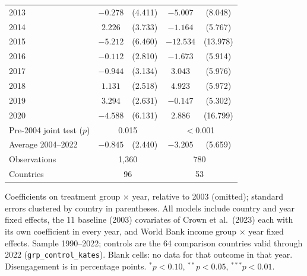 \begin{table}[htbp]
\begin{tabular}{lcccc}
2013 & $-0.278$ & (4.411) & $-5.007$ & (8.048) \\
2014 & $2.226$ & (3.733) & $-1.164$ & (5.767) \\
2015 & $-5.212$ & (6.460) & $-12.534$ & (13.978) \\
2016 & $-0.112$ & (2.810) & $-1.673$ & (5.914) \\
2017 & $-0.944$ & (3.134) & $3.043$ & (5.976) \\
2018 & $1.131$ & (2.518) & $4.923$ & (5.972) \\
2019 & $3.294$ & (2.631) & $-0.147$ & (5.302) \\
2020 & $-4.588$ & (6.131) & $2.886$ & (16.799) \\
\midrule
Pre-2004 joint test ($p$) & \multicolumn{2}{c}{0.015} & \multicolumn{2}{c}{$<$0.001} \\
Average 2004--2022 & $-0.845$ & (2.440) & $-3.205$ & (5.659) \\
Observations & \multicolumn{2}{c}{1,360} & \multicolumn{2}{c}{780} \\
Countries & \multicolumn{2}{c}{96} & \multicolumn{2}{c}{53} \\
\bottomrule
\end{tabular}
\par\vspace{4pt}
\begin{minipage}{\textwidth}\footnotesize Coefficients on treatment group $\times$ year, relative to 2003 (omitted); standard errors clustered by country in parentheses. All models include country and year fixed effects, the 11 baseline (2003) covariates of Crown et al.\ (2023) each with its own coefficient in every year, and World Bank income group $\times$ year fixed effects. Sample 1990--2022; controls are the 64 comparison countries valid through 2022 (\texttt{grp\_control\_kates}). Blank cells: no data for that outcome in that year. Disengagement is in percentage points. $^{*}p<0.10$, $^{**}p<0.05$, $^{***}p<0.01$.\end{minipage}
\end{table}
